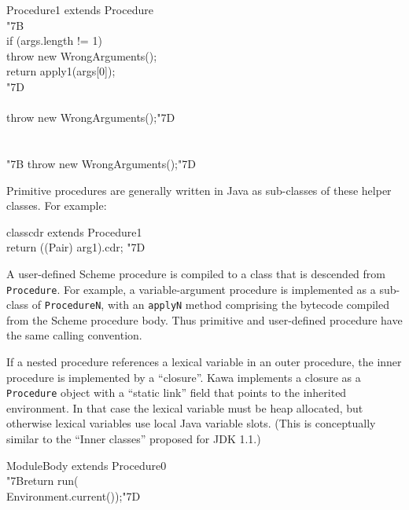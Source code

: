 \documentclass[twocolumn]{article}
\newcommand{\LBr}{\char"7B}
\newcommand{\RBr}{\char"7D}
\newcommand{\Tab}{\>}
\begin{document}
\begin{Class}{Procedure1}{ extends Procedure}
\\
{\LBr\+}\\
  if (args.length != 1)\\
  \Tab  throw new WrongArguments();\\
   return apply1(args[0]);\-\\
{\RBr}\\
\\
\Tab {\LBr} throw new WrongArguments();{\RBr}\\
\\
\\
{\LBr} throw new WrongArguments();{\RBr}\\
\end{Class}

Primitive procedures are generally written in Java as
sub-classes of these helper classes. For example:

\begin{ClassNoDots}{class}{cdr}{ extends Procedure1}
\\
\Tab {\LBr} return ((Pair) arg1).cdr; {\RBr}\\
\end{ClassNoDots}

A user-defined Scheme procedure is compiled to a
class that is descended from {\tt Procedure}.
For example, a variable-argument procedure is implemented as a
sub-class of {\tt ProcedureN}, with an {\tt applyN}
method comprising the bytecode compiled from the Scheme procedure
body.  Thus primitive and user-defined procedure have the
same calling convention.

If a nested procedure references a lexical variable in an
outer procedure, the inner procedure is implemented
by a ``closure''.  Kawa implements a closure 
as a {\tt Procedure} object with a ``static link''
field that points to the inherited
environment.  In that case the lexical variable must be
heap allocated, but otherwise lexical variables use local Java
variable slots.  (This is conceptually similar
to the ``Inner classes'' proposed for JDK 1.1.)

\label{ModuleBody}
\begin{Class}{ModuleBody}{ extends Procedure0}
\\
{\LBr}return run(\\
\Tab\Tab\Tab Environment.current());{\RBr}\\
\\
\end{Class}
\end{document}
